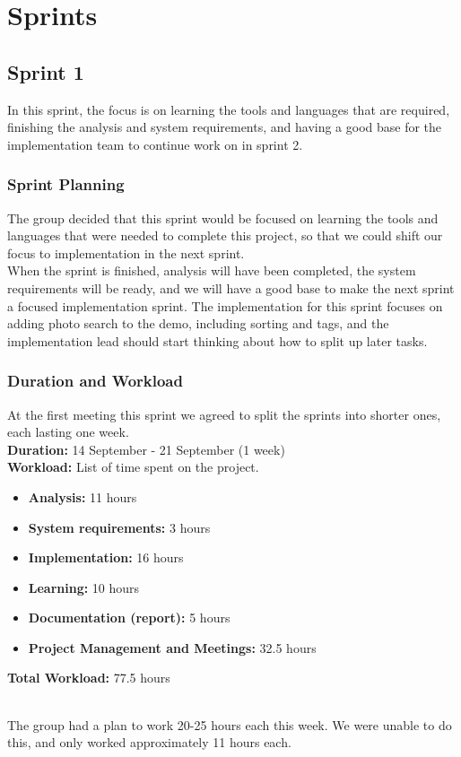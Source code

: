 \chapter{Sprints}

\newpage

\section{Sprint 1}
In this sprint, the focus is on learning the tools and languages that are required, finishing the analysis and system requirements, and having a good base for the implementation team to continue work on in sprint 2.

\subsection{Sprint Planning}
The group decided that this sprint would be focused on learning the tools and languages that were needed to complete this project, so that we could shift our focus to implementation in the next sprint. \\
\indent When the sprint is finished, analysis will have been completed, the system requirements will be ready, and we will have a good base to make the next sprint a focused implementation sprint. The implementation for this sprint focuses on adding photo search to the demo, including sorting and tags, and the implementation lead should start thinking about how to split up later tasks.

\subsection{Duration and Workload}
At the first meeting this sprint we agreed to split the sprints into shorter ones, each lasting one week. \\

\noindent \textbf{Duration: } 14 September - 21 September (1 week)\\
\noindent \textbf{Workload: } List of time spent on the project.
\begin{itemize}
\item \textbf{Analysis: } 11 hours
\item \textbf{System requirements: } 3 hours
\item \textbf{Implementation: } 16 hours 
\item \textbf{Learning: } 10 hours
\item \textbf{Documentation (report): } 5 hours
\item \textbf{Project Management and Meetings: } 32.5 hours
\end{itemize}
\noindent \textbf{Total Workload: } 77.5 hours
\subparagraph{} The group had a plan to work 20-25 hours each this week. We were unable to do this, and only worked approximately 11 hours each. %

